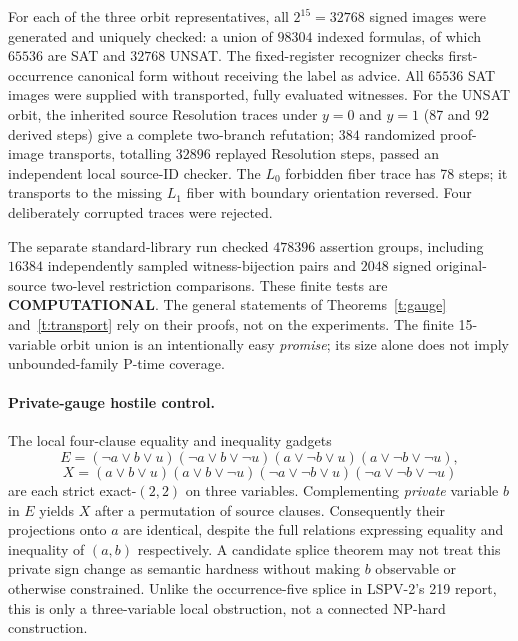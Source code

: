 \documentclass[11pt]{article}
\begin{document}
For each of the three orbit representatives, all $2^{15}=32768$ signed images were generated and uniquely checked: a union of $98304$ indexed formulas, of which $65536$ are SAT and $32768$ UNSAT. The fixed-register recognizer checks first-occurrence canonical form without receiving the label as advice. All $65536$ SAT images were supplied with transported, fully evaluated witnesses. For the UNSAT orbit, the inherited source Resolution traces under $y=0$ and $y=1$ (87 and 92 derived steps) give a complete two-branch refutation; $384$ randomized proof-image transports, totalling $32896$ replayed Resolution steps, passed an independent local source-ID checker. The $L_0$ forbidden fiber trace has 78 steps; it transports to the missing $L_1$ fiber with boundary orientation reversed. Four deliberately corrupted traces were rejected.

The separate standard-library run checked $478396$ assertion groups, including $16384$ independently sampled witness-bijection pairs and $2048$ signed original-source two-level restriction comparisons. These finite tests are \textbf{COMPUTATIONAL}. The general statements of Theorems~\ref{t:gauge} and~\ref{t:transport} rely on their proofs, not on the experiments. The finite 15-variable orbit union is an intentionally easy \emph{promise}; its size alone does not imply unbounded-family P-time coverage.

\paragraph{Private-gauge hostile control.} The local four-clause equality and inequality gadgets
\[
E=(\neg a\vee b\vee u)(\neg a\vee b\vee\neg u)(a\vee\neg b\vee u)(a\vee\neg b\vee\neg u),
\]
\[
X=(a\vee b\vee u)(a\vee b\vee\neg u)(\neg a\vee\neg b\vee u)(\neg a\vee\neg b\vee\neg u)
\]
are each strict exact-$(2,2)$ on three variables. Complementing \emph{private} variable $b$ in $E$ yields $X$ after a permutation of source clauses. Consequently their projections onto $a$ are identical, despite the full relations expressing equality and inequality of $(a,b)$ respectively. A candidate splice theorem may not treat this private sign change as semantic hardness without making $b$ observable or otherwise constrained. Unlike the occurrence-five splice in LSPV-2's 219 report, this is only a three-variable local obstruction, not a connected NP-hard construction.
\end{document}
